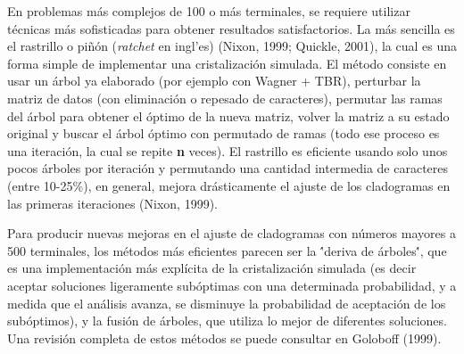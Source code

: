\begin{itemize}
\begin{enumerate}
\begin{table}[H]
{\begin{tabular}{|c|c|c|}
 \end{tabular}
 }
 \end{table}

	En problemas m\'as complejos de 100 o m\'as terminales, se requiere utilizar t\'ecnicas m\'as sofisticadas para obtener resultados satisfactorios. La m\'as sencilla es el rastrillo o pi\~n\'on (\textit{ratchet} en ingl'es) {\color{red}(Nixon,  1999; Quickle,  2001)},  la cual es una forma simple de implementar una cristalizaci\'on simulada. El m\'etodo consiste en usar un \'arbol ya elaborado (por ejemplo con Wagner + TBR),  perturbar la matriz de datos (con eliminaci\'on o repesado de caracteres), permutar las ramas del \'arbol para obtener el \'optimo de la nueva matriz,  volver la matriz a su estado original y buscar el \'arbol \'optimo con permutado de ramas (todo ese proceso es una iteraci\'on,  la cual se repite \textbf{n} veces). El rastrillo es eficiente usando solo unos pocos \'arboles por iteraci\'on y permutando una cantidad intermedia de caracteres (entre 10-25\%), en general, mejora dr\'asticamente el ajuste de los cladogramas en las primeras iteraciones (Nixon,  1999).
 
	Para producir nuevas mejoras en el ajuste de cladogramas con n\'umeros mayores a 500 terminales,  los m\'etodos m\'as eficientes parecen ser la \''deriva de \'arboles\'',  que es una implementaci\'on m\'as expl\'icita de la cristalizaci\'on simulada (es decir aceptar soluciones ligeramente sub\'optimas con una determinada probabilidad,  y a medida que el an\'alisis avanza,  se disminuye la probabilidad de aceptaci\'on de los sub\'optimos),  y la fusi\'on de \'arboles,  que utiliza lo mejor de diferentes soluciones. Una revisi\'on completa de estos m\'etodos se puede consultar en {\color{red} Goloboff (1999)}.
  
  




\end{enumerate}
\end{itemize}
